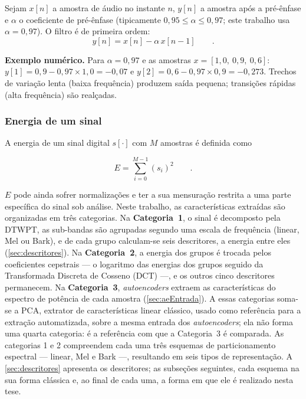 				\par Sejam $x[n]$ a amostra de áudio no instante $n$, $y[n]$ a amostra após a pré-ênfase e $\alpha$ o coeficiente de pré-ênfase (tipicamente $0{,}95 \leqslant \alpha \leqslant 0{,}97$; este trabalho usa $\alpha=0{,}97$). O filtro é de primeira ordem:
				\begin{equation}
					\label{eq:preemphasis}
					y[n] = x[n] - \alpha\, x[n-1] \qquad.
				\end{equation}

				\par \textbf{Exemplo numérico.} Para $\alpha=0{,}97$ e as amostras $x=[1{,}0,\ 0{,}9,\ 0{,}6]$: $y[1] = 0{,}9 - 0{,}97\times1{,}0 = -0{,}07$ e $y[2] = 0{,}6 - 0{,}97\times0{,}9 = -0{,}273$. Trechos de variação lenta (baixa frequência) produzem saída pequena; transições rápidas (alta frequência) são realçadas.

			\subsubsection{Energia de um sinal}
				\par A energia de um sinal digital $s[\cdot]$ com $M$ amostras é definida como
			
			\begin{equation}
				E = \sum\limits_{i=0}^{M-1}(s_i)^2 \qquad.   
			\end{equation}
			
			$E$ pode ainda sofrer normalizações e ter a sua mensuração restrita a uma parte específica do sinal sob análise. Neste trabalho, as características extraídas são organizadas em três categorias. Na \textbf{Categoria~1}, o sinal é decomposto pela \ac{DTWPT}, as sub-bandas são agrupadas segundo uma escala de frequência (linear, Mel ou Bark), e de cada grupo calculam-se seis descritores, a energia entre eles (\autoref{sec:descritores}). Na \textbf{Categoria~2}, a energia dos grupos é trocada pelos coeficientes cepstrais --- o logaritmo das energias dos grupos seguido da Transformada Discreta de Cosseno (DCT) ---, e os outros cinco descritores permanecem. Na \textbf{Categoria~3}, \textit{autoencoders} extraem as características do espectro de potência de cada amostra (\autoref{sec:aeEntrada}). A essas categorias soma-se a \ac{PCA}, extrator de características linear clássico, usado como referência para a extração automatizada, sobre a mesma entrada dos \textit{autoencoders}; ela não forma uma quarta categoria: é a referência com que a Categoria~3 é comparada. As categorias 1 e 2 compreendem cada uma três esquemas de particionamento espectral --- linear, Mel e Bark ---, resultando em seis tipos de representação. A \autoref{sec:descritores} apresenta os descritores; as subseções seguintes, cada esquema na sua forma clássica e, ao final de cada uma, a forma em que ele é realizado nesta tese.

